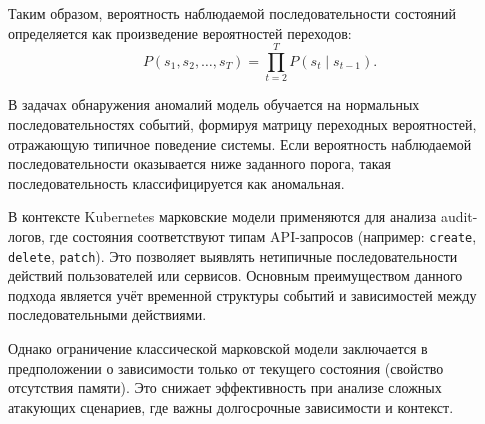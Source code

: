 Таким образом, вероятность наблюдаемой последовательности состояний определяется как произведение вероятностей переходов:
$$
P(s_1, s_2, \dots, s_T) = \prod_{t=2}^{T} P(s_t \mid s_{t-1}).
$$

В задачах обнаружения аномалий модель обучается на нормальных последовательностях событий, формируя матрицу переходных вероятностей, отражающую типичное поведение системы. Если вероятность наблюдаемой последовательности оказывается ниже заданного порога, такая последовательность классифицируется как аномальная.

В контексте Kubernetes марковские модели применяются для анализа audit-логов, где состояния соответствуют типам API-запросов (например: \texttt{create}, \texttt{delete}, \texttt{patch}). Это позволяет выявлять нетипичные последовательности действий пользователей или сервисов. Основным преимуществом данного подхода является учёт временной структуры событий и зависимостей между последовательными действиями.

Однако ограничение классической марковской модели заключается в предположении о зависимости только от текущего состояния (свойство отсутствия памяти). Это снижает эффективность при анализе сложных атакующих сценариев, где важны долгосрочные зависимости и контекст.